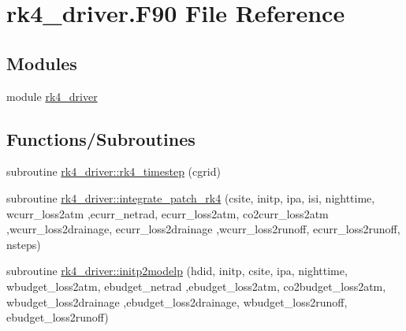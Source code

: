 \hypertarget{rk4__driver_8_f90}{}\section{rk4\+\_\+driver.\+F90 File Reference}
\label{rk4__driver_8_f90}
\subsection*{Modules}
\begin{DoxyCompactItemize}
\item 
module \hyperlink{namespacerk4__driver}{rk4\+\_\+driver}
\end{DoxyCompactItemize}
\subsection*{Functions/\+Subroutines}
\begin{DoxyCompactItemize}
\item 
subroutine \hyperlink{namespacerk4__driver_abf8bd20405c7ed6a7bab3bdb18d8de87}{rk4\+\_\+driver\+::rk4\+\_\+timestep} (cgrid)
\item 
subroutine \hyperlink{namespacerk4__driver_a673e029fcdae29e8babb8af8b47fe412}{rk4\+\_\+driver\+::integrate\+\_\+patch\+\_\+rk4} (csite, initp, ipa, isi, nighttime, wcurr\+\_\+loss2atm                                                                                                                                                                               ,ecurr\+\_\+netrad, ecurr\+\_\+loss2atm, co2curr\+\_\+loss2atm                                                                                                                                                                               ,wcurr\+\_\+loss2drainage, ecurr\+\_\+loss2drainage                                                                                                                                                                                                   ,wcurr\+\_\+loss2runoff, ecurr\+\_\+loss2runoff, nsteps)
\item 
subroutine \hyperlink{namespacerk4__driver_ade74d4c727e71886d8b603f09b8708d9}{rk4\+\_\+driver\+::initp2modelp} (hdid, initp, csite, ipa, nighttime, wbudget\+\_\+loss2atm, ebudget\+\_\+netrad                                                                                                       ,ebudget\+\_\+loss2atm, co2budget\+\_\+loss2atm, wbudget\+\_\+loss2drainage                                                                                                                           ,ebudget\+\_\+loss2drainage, wbudget\+\_\+loss2runoff, ebudget\+\_\+loss2runoff)
\end{DoxyCompactItemize}
